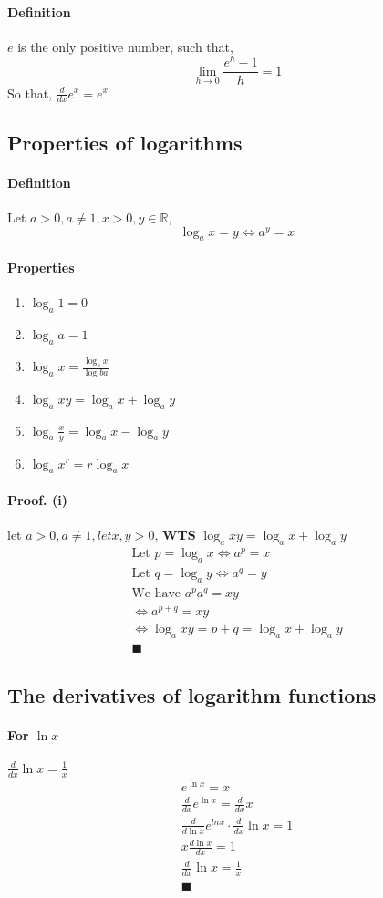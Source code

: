 \documentclass{article}
\begin{document}
	\paragraph{Definition} $e$ is the only positive number, such that,
	\[
	\lim_{h \to 0}\frac{e^h - 1}{h} = 1 
	\]
	So that, $\frac{d}{dx} e^x = e^x$
	\subsection{Properties of logarithms}
	\paragraph{Definition} Let $a > 0, a\neq 1, x >0,y \in \mathbb{R}$,
	\[
	\log_{a}x = y \iff a^y = x
	\]
	\paragraph{Properties}
	\begin{enumerate}
		\item $\log_{a}1 = 0$
		\item $\log_{a}a = 1$
		\item $\log_{a}x = \frac{\log_{b}x}{\log{b}a}$
		\item $\log_{a}{xy} = \log_{a}x + \log_{a}y$
		\item $\log_{a}{\frac{x}{y}} = \log_{a}x - \log_{a}y$
		\item $\log_{a}x^r = r \log_{a}x$
	\end{enumerate}
	\paragraph{Proof. (i)} let $a>0, a \neq 1, let x,y > 0$, \textbf{WTS} $\log_{a}{xy} = \log_{a}x + \log_{a}y$
	\begin{align*}
		\text{Let } p = \log_{a}x \iff a^p = x \\
		\text{Let } q = \log_{a}y \iff a^q = y \\
		\text{We have } a^p a^q = xy \\
		\iff a^{p+q} = xy \\
		\iff \log_{a}{xy} = p+q = \log_{a}x + \log_{a}y \\
		\blacksquare
	\end{align*}
	\subsection{The derivatives of logarithm functions}
	\paragraph{For $\ln{x}$} $\frac{d}{dx}\ln{x} = \frac{1}{x}$
	\begin{align*}
		e^{\ln{x}} = x \\
		\frac{d}{dx} e^{\ln{x}} = \frac{d}{dx} x \\
		\frac{d}{d\ln{x}}e^{ln{x}} \cdot \frac{d}{dx}\ln{x} = 1 \\
		x \frac{d\ln{x}}{dx} = 1 \\
		\frac{d}{dx}\ln{x} = \frac{1}{x} \\
		\blacksquare
	\end{align*}
\end{document}
